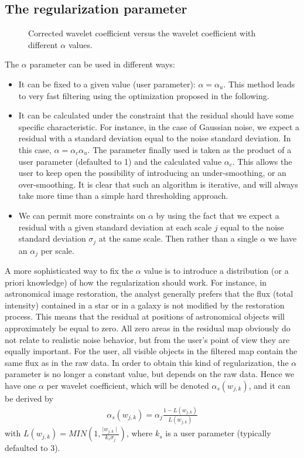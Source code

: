 \subsection{The regularization parameter}

\begin{figure}[htb]
\centerline{
\vbox{
}}
\caption{Corrected wavelet coefficient versus the wavelet coefficient with
different $\alpha$ values.}
\label{fig_tab2}
\end{figure}

The $\alpha$ parameter can be used in different ways: 
\begin{itemize}
\item It can be fixed to a given value (user parameter): $\alpha = \alpha_u$.
This method leads to very fast filtering using the optimization proposed
in the following.
\item It can be calculated
under the constraint that the residual should have some specific 
characteristic. For instance, in the case of Gaussian noise, we expect 
a residual
with a standard deviation equal to the noise standard deviation. In this case,
$\alpha = \alpha_c \alpha_u$. The parameter finally used is taken as the
product of a user parameter (defaulted to 1) and the calculated
value $\alpha_c$. This allows the user to keep open the possibility of 
introducing an
under-smoothing, or an over-smoothing. It is clear that such an algorithm 
is iterative, and will
always take more time than a simple hard thresholding approach.
\item We can permit more constraints on  $\alpha$ by using the fact that 
we expect a residual with a given standard deviation at each scale $j$ 
equal to the noise standard deviation $\sigma_j$ at the same scale. Then
rather than  a single $\alpha$ we have an $\alpha_j$ per scale.
\end{itemize}

A more sophisticated way to fix the $\alpha$ value is to introduce a 
distribution  
(or a priori knowledge) of how the regularization should work. 
For instance, in astronomical
image restoration, the analyst generally prefers that the flux 
(total intensity)
contained in a star or in a galaxy is not modified by the restoration process.
This means that the residual at positions of astronomical objects will 
approximately be equal to zero. All zero areas in the residual map 
obviously do not relate to realistic noise behavior, but from 
the user's point of view they are equally important. For the user, all 
visible objects in the filtered map 
contain the same flux as in the raw data. In order to obtain this kind
of regularization, the $\alpha$ parameter is no longer a constant value, but
depends on the raw data. Hence we have one $\alpha$ per wavelet coefficient,
which will be denoted $\alpha_s(w_{j,k})$, and it can be derived by
\begin{eqnarray}
\alpha_s(w_{j,k}) = \alpha_j \frac{1 - L(w_{j,k})}{L(w_{j,k})}
\label{eqn_alpha}
\end{eqnarray}
with $L(w_{j,k}) = MIN(1, \frac{\mid w_{j,k} \mid }{k_s \sigma_j})$, 
where $k_s$ is a user parameter (typically defaulted to 3).


